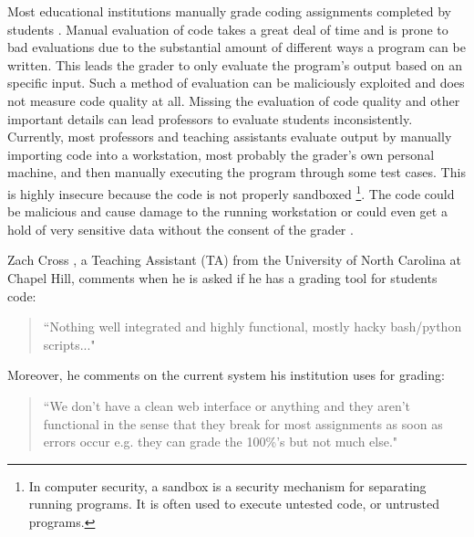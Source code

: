 
Most educational institutions manually grade coding assignments completed by
students \cite{Cheang2003}. Manual evaluation of code takes a great deal of time
and is prone to bad evaluations due to the substantial amount of different ways
a program can be written. This leads the grader to only evaluate the program's
output based on an specific input. Such a method of evaluation can be
maliciously exploited and does not measure code quality at all. Missing the
evaluation of code quality and other important details can lead professors to
evaluate students inconsistently. Currently, most professors and teaching
assistants evaluate output by manually importing code into a workstation, most
probably the grader's own personal machine, and then manually executing the
program through some test cases. This is highly insecure because the code is not
properly sandboxed \footnote{In computer security, a sandbox is a security
mechanism for separating running programs. It is often used to execute untested
code, or untrusted programs.}. The code could be malicious and cause damage to
the running workstation or could even get a hold of very sensitive data without
the consent of the grader \cite{Cheang2003}.


Zach Cross \cite{Zach}, a Teaching Assistant (TA) from the University of North
Carolina at Chapel Hill, comments when he is asked if he has a grading tool
for students code: \begin{quote} ``Nothing well integrated and highly
functional, mostly hacky bash/python scripts..." \end{quote} Moreover, he
comments on the current system his institution uses for grading: \begin{quote}
``We don't have a clean web interface or anything and they aren't functional
in the sense that they break for most assignments as soon as errors occur e.g.
they can grade the 100\%'s but not much else." \end{quote}

